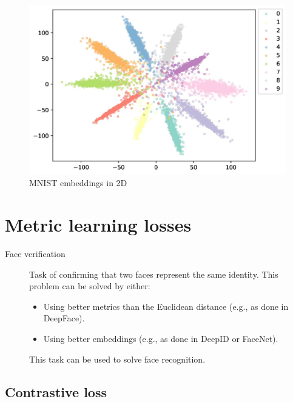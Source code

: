 \begin{description}
\begin{remark}
            \begin{figure}[H]
                \centering
                \includegraphics[width=0.45\linewidth]{./img/_mnist_embeddings.jpg}
                \caption{MNIST embeddings in 2D}
            \end{figure}
        \end{remark}
\end{description}



\section{Metric learning losses}

\begin{description}
    \item[Face verification] 
        Task of confirming that two faces represent the same identity. This problem can be solved by either:
        \begin{itemize}
            \item Using better metrics than the Euclidean distance (e.g., as done in DeepFace).
            \item Using better embeddings (e.g., as done in DeepID or FaceNet).
        \end{itemize}

        \begin{remark}
            This task can be used to solve face recognition.
        \end{remark}
\end{description}


\subsection{Contrastive loss}


